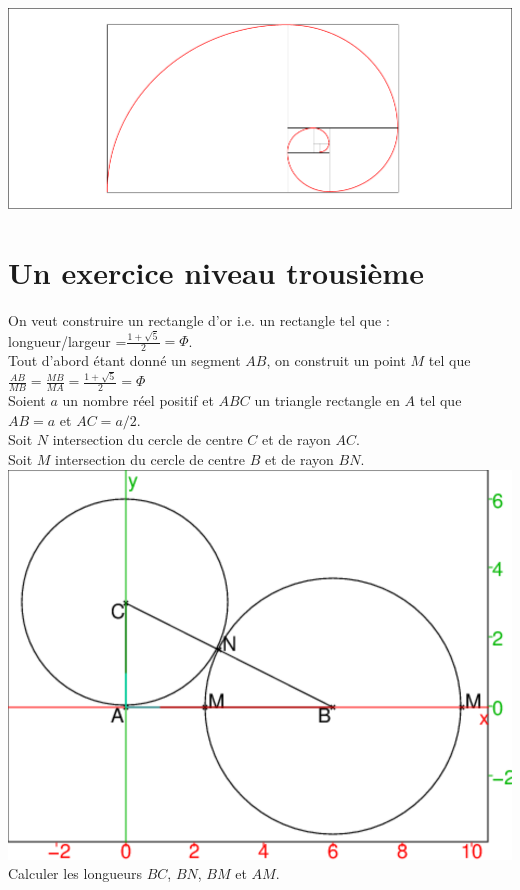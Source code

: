 \documentclass[a4paper,11pt]{book}
\begin{document}
\includegraphics[width=\textwidth]{fibonspi}
\section{Un exercice niveau trousi\`eme}
On veut construire un rectangle d'or i.e. un rectangle tel que :\\
longueur/largeur =$\frac{1+\sqrt 5}{2}=\Phi$.\\
Tout d'abord \'etant donn\'e un segment $AB$, on construit un point $M$ tel que
$\frac{AB}{MB}=\frac{MB}{MA}=\frac{1+\sqrt 5}{2}=\Phi$\\
Soient $a$ un nombre r\'eel positif et $ABC$ un triangle rectangle en $A$ tel 
que $AB=a$ et $AC=a/2$.\\
Soit $N$ intersection du cercle de centre $C$ et de rayon $AC$.\\
Soit $M$ intersection du cercle de centre $B$ et de rayon $BN$.\\
\includegraphics[width=\textwidth]{fibonap}\\
Calculer les longueurs $BC$, $BN$, $BM$ et $AM$.\\
\end{document}
